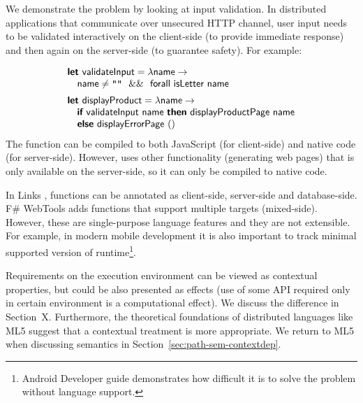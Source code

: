 We demonstrate the problem by looking at input validation. In distributed applications 
that communicate over unsecured HTTP channel, user input needs to be validated interactively
on the client-side (to provide immediate response) and then again on the server-side (to 
guarantee safety). For example:

\begin{equation*}
\begin{array}{l}
\kvd{let}~\ident{validateInput} = \lambda \ident{name} \rightarrow\\
\quad\ident{name} \neq \str{""} ~~\&\&~~ \ident{forall~isLetter~name}
\\[0.5em]
\kvd{let}~\ident{displayProduct} = \lambda \ident{name} \rightarrow\\
\quad\kvd{if}~\ident{validateInput name}~\kvd{then}~\ident{displayProductPage~name}\\
\quad\kvd{else}~\ident{displayErrorPage}~() 
\end{array}
\end{equation*}
%
The function  can be compiled to both JavaScript (for client-side) and
native code (for server-side). However,  uses other functionality
(generating web pages) that is only available on the server-side, so it can only be compiled to
native code.

In Links \cite{app-distributed-links}, functions can be annotated as client-side, server-side
and database-side. F\# WebTools \cite{app-fsharp-webtools} adds functions that support multiple
targets (mixed-side). However, these are single-purpose language features and they are not 
extensible. For example, in modern mobile development it is also important to track minimal 
supported version of runtime\footnote{Android Developer guide \cite{app-android-multitarget} 
demonstrates how difficult it is to solve the problem without language support.}. 

Requirements on the execution environment can be viewed as contextual properties, but could be
also presented as effects (use of some API required only in certain environment is a computational
effect). We discuss the difference in Section~X. Furthermore, the theoretical foundations of
distributed languages like ML5 \cite{app-distributed-ml5} suggest that a contextual treatment
is more appropriate. We return to ML5 when discussing semantics in Section~\ref{sec:path-sem-contextdep}.


